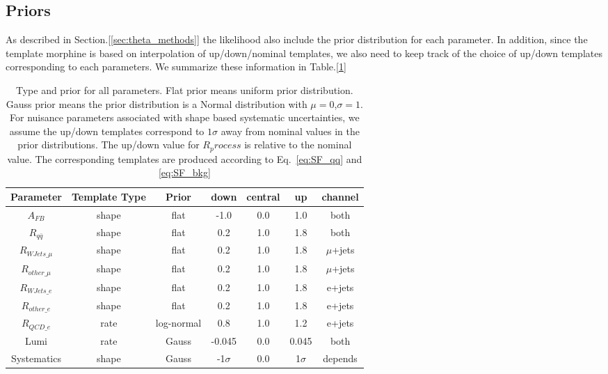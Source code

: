 \documentclass{cmspaperpdf}
\begin{document}
\subsection{Priors}
As described in Section.[\ref{sec:theta_methods}] the likelihood also include the prior distribution for each parameter. In addition, since the template morphine is based on interpolation of up/down/nominal templates, we also need to keep track of the choice of up/down templates corresponding to each parameters. We summarize these information in Table.[\ref{table:priors}]

\begin{table}[htb]
\centering
\begin{tabular}{|c|c c|c c c| c |}
\hline
Parameter     & Template Type & Prior         & down  & central  & up  & channel   \\ \hline
$A_{FB}$      & shape         & flat         & -1.0  & 0.0  & 1.0  & both \\
$R_{q\bar{q}}$ & shape         & flat         & 0.2  & 1.0  & 1.8  & both \\ \hline\hline

$R_{WJets\_\mu}$   & shape         & flat        & 0.2   & 1.0   & 1.8 & $\mu$+jets \\ 
$R_{other\_\mu}$   & shape         & flat         & 0.2   & 1.0  & 1.8 & $\mu$+jets \\
$R_{WJets\_e}$   & shape         & flat        & 0.2   & 1.0   & 1.8 & e+jets \\ 
$R_{other\_e}$   & shape         & flat         & 0.2   & 1.0  & 1.8 & e+jets \\
$R_{QCD\_e}$     & rate         & log-normal         & 0.8   & 1.0  & 1.2 & e+jets \\
Lumi          & rate          & Gauss      & -0.045 & 0.0   & 0.045 & both\\
Systematics   & shape         & Gauss      & -1$\sigma$ & 0.0 & 1$\sigma$  & depends \\ \hline\hline
\end{tabular}
\caption{Type and prior for all parameters. Flat prior means uniform prior distribution. Gauss prior means the prior distribution is a Normal distribution with $\mu=0$,$\sigma=1$. For nuisance parameters associated with shape based systematic uncertainties, we assume the up/down templates correspond to $1 \sigma$ away from nominal values in the prior distributions. The up/down value for $R_process$ is relative to the nominal value. The corresponding templates are produced according to Eq.~\ref{eq:SF_qq} and \ref{eq:SF_bkg} }
\label{table:priors}
\end{table}
\end{document}
